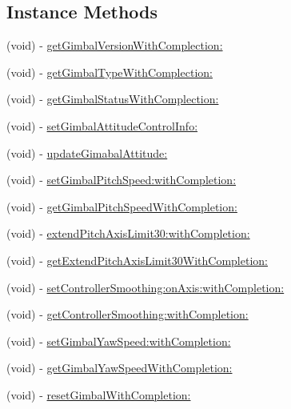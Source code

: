 \subsection*{Instance Methods}
\begin{DoxyCompactItemize}
\item 
(void) -\/ \hyperlink{interface_p_v_gimabal_ab7f782bde28693b3647bd48694f3d3f1}{get\+Gimbal\+Version\+With\+Complection\+:}
\item 
(void) -\/ \hyperlink{interface_p_v_gimabal_a8937f926f4f8b06a20937ae541b55e27}{get\+Gimbal\+Type\+With\+Complection\+:}
\item 
(void) -\/ \hyperlink{interface_p_v_gimabal_ab62ca2f24df0aa61a97984663767eb9c}{get\+Gimbal\+Status\+With\+Complection\+:}
\item 
(void) -\/ \hyperlink{interface_p_v_gimabal_af28099b83b3e0948fee61e721e0790b3}{set\+Gimbal\+Attitude\+Control\+Info\+:}
\item 
(void) -\/ \hyperlink{interface_p_v_gimabal_a4936daad2a491d8244a8645a33bdce84}{update\+Gimabal\+Attitude\+:}
\item 
(void) -\/ \hyperlink{interface_p_v_gimabal_a03d3aac39d87e50384c388f1dc28c012}{set\+Gimbal\+Pitch\+Speed\+:with\+Completion\+:}
\item 
(void) -\/ \hyperlink{interface_p_v_gimabal_a3784401e0533479bf5abd8fa52c5900e}{get\+Gimbal\+Pitch\+Speed\+With\+Completion\+:}
\item 
(void) -\/ \hyperlink{interface_p_v_gimabal_af0948378a45db8868439fd3457246dd2}{extend\+Pitch\+Axis\+Limit30\+:with\+Completion\+:}
\item 
(void) -\/ \hyperlink{interface_p_v_gimabal_aa2a594744332480f17f85aec2a22f4bf}{get\+Extend\+Pitch\+Axis\+Limit30\+With\+Completion\+:}
\item 
(void) -\/ \hyperlink{interface_p_v_gimabal_ababb62efa51b69c4a043ae61438a1f34}{set\+Controller\+Smoothing\+:on\+Axis\+:with\+Completion\+:}
\item 
(void) -\/ \hyperlink{interface_p_v_gimabal_ab18eed4f5255289a86d46777a37f95f1}{get\+Controller\+Smoothing\+:with\+Completion\+:}
\item 
(void) -\/ \hyperlink{interface_p_v_gimabal_aaaad76567d8ba219e2810ac929d1730b}{set\+Gimbal\+Yaw\+Speed\+:with\+Completion\+:}
\item 
(void) -\/ \hyperlink{interface_p_v_gimabal_a2f1444c7c893cbea743e15eced590672}{get\+Gimbal\+Yaw\+Speed\+With\+Completion\+:}
\item 
(void) -\/ \hyperlink{interface_p_v_gimabal_ad89b5c7c17d403b8c19e64b7a827db37}{reset\+Gimbal\+With\+Completion\+:}

\end{DoxyCompactItemize}
